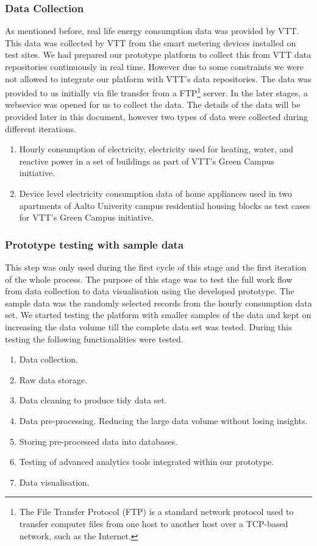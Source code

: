 \subsubsection{Data Collection}\label{datacollect}
As mentioned before, real life energy consumption data was provided by VTT. This data was collected by VTT from the smart metering devices installed on test sites. We had prepared our prototype platform to collect this from VTT data repositories continuously in real time. However due to some constraints we were not allowed to integrate our platform with VTT's data repositories. The data was provided to us initially via file transfer from a FTP\footnote{The File Transfer Protocol (FTP) is a standard network protocol used to transfer computer files from one host to another host over a TCP-based network, such as the Internet.} server. In the later stages, a websevice was opened for us to collect the data. The details of the data will be provided later in this document, however two types of data were collected during different iterations.
\begin{enumerate}
\item Hourly consumption of electricity, electricity used for heating, water, and reactive power in a set of buildings as part of VTT's Green Campus initiative.
\item Device level electricity consumption data of home appliances used in two apartments of Aalto Univerity campus residential housing blocks as test cases for VTT's Green Campus initiative.

\end{enumerate}
\subsubsection{Prototype testing with sample data}\label{prototype}
This step was only used during the first cycle of this stage and the first iteration of the whole process. The purpose of this stage was to test the full work flow from data collection to data visualisation using the developed prototype. The sample data was the randomly selected records from the hourly consumption data set. We started testing the platform with smaller samples of the data and kept on increasing the data volume till the complete data set was tested. During this testing the following functionalities were tested.
\begin{enumerate}
\item Data collection.
\item Raw data storage.
\item Data cleaning to produce tidy data set.
\item Data pre-processing. Reducing the large data volume without losing insights. 
\item Storing pre-processed data into databases.
\item Testing of advanced analytics tools integrated within our prototype.
\item Data visualisation.  
\end{enumerate}
